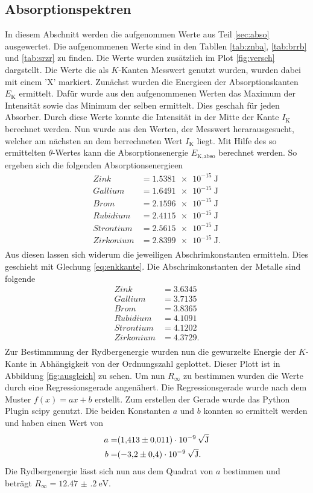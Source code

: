 \FloatBarrier

\subsection{Absorptionspektren}
In diesem Abschnitt werden die aufgenommen Werte aus Teil \ref{sec:abso} ausgewertet.
Die aufgenommenen Werte sind in den Tabllen \ref{tab:znba}, \ref{tab:brrb} und \ref{tab:srzr} zu finden.
Die Werte wurden zusätzlich im Plot \ref{fig:versch} dargstellt.
Die Werte die als $K$-Kanten Messwert genutzt wurden, wurden dabei mit einem 'X' markiert.
Zunächst wurden die Energieen der Absorptionskanten $E_\text{K}$ ermittelt.
Dafür wurde aus den aufgenommenen Werten das Maximum der Intensität sowie das Minimum der selben ermittelt.
Dies geschah für jeden Absorber.
Durch diese Werte konnte die Intensität in der Mitte der Kante $I_\text{K}$ berechnet werden.
Nun wurde aus den Werten, der Messwert herarausgesucht, welcher am nächsten an dem berrechneten Wert $I_\text{K}$ liegt.
Mit Hilfe des so ermittelten $\theta$-Wertes kann die Absorptionsenergie $E_\text{K,abso}$ berechnet werden.
So ergeben sich die folgenden Absorptionsenergieen
\begin{align*}
Zink & = \SI{1.5381e-15}{\J} \\
Gallium & = \SI{1.6491e-15 }{\J}\\
Brom & = \SI{2.1596e-15 }{\J} \\
Rubidium & = \SI{2.4115e-15}{\J} \\
Strontium & = \SI{2.5615e-15}{\J}  \\
Zirkonium & = \SI{2.8399e-15}{\J}.  \\
\end{align*}
Aus diesen lassen sich widerum die jeweiligen Abschrimkonstanten ermitteln.
Dies geschieht mit Glechung \eqref{eq:enkkante}.
Die Abschrimkonstanten der Metalle sind folgende
\begin{align*}
  Zink & = 3.6345   \\
  Gallium & = 3.7135 \\
  Brom & = 3.8365 \\
  Rubidium & = 4.1091 \\
  Strontium & = 4.1202\\ 
  Zirkonium & = 4.3729.\\
\end{align*}
Zur Bestimmmung der Rydbergenergie wurden nun die gewurzelte Energie der $K$-Kante in Abhängigkeit von der Ordnungszahl geplottet.
Dieser Plott ist in Abbildung \ref{fig:ausgleich} zu sehen.
Um nun $R_\infty$ zu bestimmen wurden die Werte durch eine Regressionsgerade angenähert.
Die Regressionsgerade wurde nach dem Muster $f(x) = ax+b$ erstellt.
Zum erstellen der Gerade wurde das Python Plugin scipy \cite{scipy} genutzt.
Die beiden Konstanten $a$ und $b$ konnten so ermittelt werden und haben einen Wert von 
\begin{align}
  a =& \SI{1.413(11)e-09}{\sqrt{\J}}\\
  b=& \SI{-3.2(4)e-09}{\sqrt{\J}}.\\
\end{align}
Die Rydbergenergie lässt sich nun aus dem Quadrat von $a$ bestimmen und beträgt $R_\infty = \SI{12.47(20)}{\eV}$.


